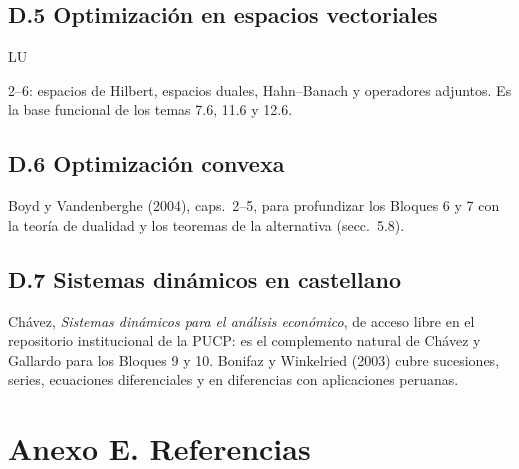 \documentclass[11pt,a4paper]{article}
\newcommand{\etiqueta}[2]{%
  {\setlength{\fboxsep}{1.4pt}\colorbox{#1}{\sffamily\bfseries\color{white}\strut#2}}}
\newcommand{\LU}[1]{\etiqueta{colorLU}{LU}\nobreak\hspace{0.25em}\textcolor{colorLU}{#1}}
\begin{document}
\subsection*{D.5 Optimización en espacios vectoriales}
\LU{2--6}: espacios de Hilbert, espacios duales, Hahn--Banach y operadores
adjuntos. Es la base funcional de los temas 7.6, 11.6 y 12.6.

\subsection*{D.6 Optimización convexa}
Boyd y Vandenberghe (2004), caps.~2--5, para profundizar los Bloques 6 y 7 con
la teoría de dualidad y los teoremas de la alternativa (secc.~5.8).

\subsection*{D.7 Sistemas dinámicos en castellano}
Chávez, \emph{Sistemas dinámicos para el análisis económico}, de acceso libre
en el repositorio institucional de la PUCP: es el complemento natural de
Chávez y Gallardo para los Bloques 9 y 10. Bonifaz y Winkelried (2003)
cubre sucesiones, series, ecuaciones diferenciales y en diferencias con
aplicaciones peruanas.

\section*{Anexo E. Referencias}
\end{document}
